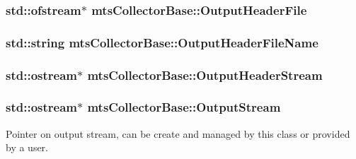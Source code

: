 \subsubsection[{Output\+Header\+File}]{\setlength{\rightskip}{0pt plus 5cm}std\+::ofstream$\ast$ mts\+Collector\+Base\+::\+Output\+Header\+File\hspace{0.3cm}{\ttfamily [protected]}}\label{classmts_collector_base_ac11bfb1b9eceb30e20bb216454e8d067}
\hypertarget{classmts_collector_base_adf377242f1cf745ccedf71f6505d1095}{}
\subsubsection[{Output\+Header\+File\+Name}]{\setlength{\rightskip}{0pt plus 5cm}std\+::string mts\+Collector\+Base\+::\+Output\+Header\+File\+Name\hspace{0.3cm}{\ttfamily [protected]}}\label{classmts_collector_base_adf377242f1cf745ccedf71f6505d1095}
\hypertarget{classmts_collector_base_aa58c68b0e196175b2f0b35f8a2877c54}{}
\subsubsection[{Output\+Header\+Stream}]{\setlength{\rightskip}{0pt plus 5cm}std\+::ostream$\ast$ mts\+Collector\+Base\+::\+Output\+Header\+Stream\hspace{0.3cm}{\ttfamily [protected]}}\label{classmts_collector_base_aa58c68b0e196175b2f0b35f8a2877c54}
\hypertarget{classmts_collector_base_a4901f9bf045081f0d79ada98fb06c57b}{}
\subsubsection[{Output\+Stream}]{\setlength{\rightskip}{0pt plus 5cm}std\+::ostream$\ast$ mts\+Collector\+Base\+::\+Output\+Stream\hspace{0.3cm}{\ttfamily [protected]}}\label{classmts_collector_base_a4901f9bf045081f0d79ada98fb06c57b}
Pointer on output stream, can be create and managed by this class or provided by a user. \hypertarget{classmts_collector_base_a86d6b8c24e20957932325ce8183d0abf}{}
